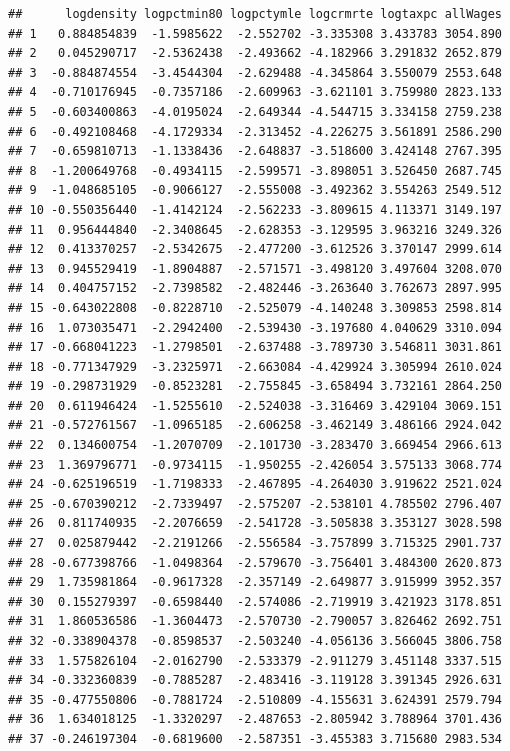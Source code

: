 \documentclass[]{article}
\begin{document}
\begin{verbatim}
##      logdensity logpctmin80 logpctymle logcrmrte logtaxpc allWages
## 1   0.884854839  -1.5985622  -2.552702 -3.335308 3.433783 3054.890
## 2   0.045290717  -2.5362438  -2.493662 -4.182966 3.291832 2652.879
## 3  -0.884874554  -3.4544304  -2.629488 -4.345864 3.550079 2553.648
## 4  -0.710176945  -0.7357186  -2.609963 -3.621101 3.759980 2823.133
## 5  -0.603400863  -4.0195024  -2.649344 -4.544715 3.334158 2759.238
## 6  -0.492108468  -4.1729334  -2.313452 -4.226275 3.561891 2586.290
## 7  -0.659810713  -1.1338436  -2.648837 -3.518600 3.424148 2767.395
## 8  -1.200649768  -0.4934115  -2.599571 -3.898051 3.526450 2687.745
## 9  -1.048685105  -0.9066127  -2.555008 -3.492362 3.554263 2549.512
## 10 -0.550356440  -1.4142124  -2.562233 -3.809615 4.113371 3149.197
## 11  0.956444840  -2.3408645  -2.628353 -3.129595 3.963216 3249.326
## 12  0.413370257  -2.5342675  -2.477200 -3.612526 3.370147 2999.614
## 13  0.945529419  -1.8904887  -2.571571 -3.498120 3.497604 3208.070
## 14  0.404757152  -2.7398582  -2.482446 -3.263640 3.762673 2897.995
## 15 -0.643022808  -0.8228710  -2.525079 -4.140248 3.309853 2598.814
## 16  1.073035471  -2.2942400  -2.539430 -3.197680 4.040629 3310.094
## 17 -0.668041223  -1.2798501  -2.637488 -3.789730 3.546811 3031.861
## 18 -0.771347929  -3.2325971  -2.663084 -4.429924 3.305994 2610.024
## 19 -0.298731929  -0.8523281  -2.755845 -3.658494 3.732161 2864.250
## 20  0.611946424  -1.5255610  -2.524038 -3.316469 3.429104 3069.151
## 21 -0.572761567  -1.0965185  -2.606258 -3.462149 3.486166 2924.042
## 22  0.134600754  -1.2070709  -2.101730 -3.283470 3.669454 2966.613
## 23  1.369796771  -0.9734115  -1.950255 -2.426054 3.575133 3068.774
## 24 -0.625196519  -1.7198333  -2.467895 -4.264030 3.919622 2521.024
## 25 -0.670390212  -2.7339497  -2.575207 -2.538101 4.785502 2796.407
## 26  0.811740935  -2.2076659  -2.541728 -3.505838 3.353127 3028.598
## 27  0.025879442  -2.2191266  -2.556584 -3.757899 3.715325 2901.737
## 28 -0.677398766  -1.0498364  -2.579670 -3.756401 3.484300 2620.873
## 29  1.735981864  -0.9617328  -2.357149 -2.649877 3.915999 3952.357
## 30  0.155279397  -0.6598440  -2.574086 -2.719919 3.421923 3178.851
## 31  1.860536586  -1.3604473  -2.570730 -2.790057 3.826462 2692.751
## 32 -0.338904378  -0.8598537  -2.503240 -4.056136 3.566045 3806.758
## 33  1.575826104  -2.0162790  -2.533379 -2.911279 3.451148 3337.515
## 34 -0.332360839  -0.7885287  -2.483416 -3.119128 3.391345 2926.631
## 35 -0.477550806  -0.7881724  -2.510809 -4.155631 3.624391 2579.794
## 36  1.634018125  -1.3320297  -2.487653 -2.805942 3.788964 3701.436
## 37 -0.246197304  -0.6819600  -2.587351 -3.455383 3.715680 2983.534

\end{verbatim}
\end{document}
